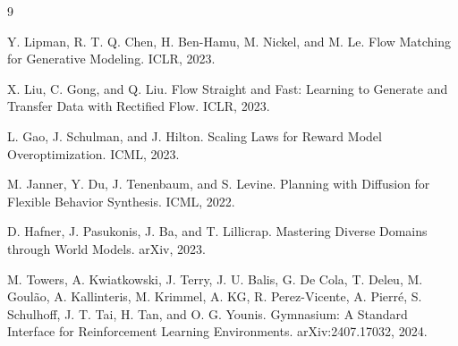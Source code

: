 \documentclass[10pt]{article}
\begin{document}
\begin{thebibliography}{9}

Y. Lipman, R. T. Q. Chen, H. Ben-Hamu, M. Nickel, and M. Le.
Flow Matching for Generative Modeling.
ICLR, 2023.

X. Liu, C. Gong, and Q. Liu.
Flow Straight and Fast: Learning to Generate and Transfer Data with Rectified Flow.
ICLR, 2023.

L. Gao, J. Schulman, and J. Hilton.
Scaling Laws for Reward Model Overoptimization.
ICML, 2023.

M. Janner, Y. Du, J. Tenenbaum, and S. Levine.
Planning with Diffusion for Flexible Behavior Synthesis.
ICML, 2022.

D. Hafner, J. Pasukonis, J. Ba, and T. Lillicrap.
Mastering Diverse Domains through World Models.
arXiv, 2023.

M. Towers, A. Kwiatkowski, J. Terry, J. U. Balis, G. De Cola, T. Deleu, M. Goul{\~a}o, A. Kallinteris, M. Krimmel, A. KG, R. Perez-Vicente, A. Pierr{\'e}, S. Schulhoff, J. T. Tai, H. Tan, and O. G. Younis.
Gymnasium: A Standard Interface for Reinforcement Learning Environments.
arXiv:2407.17032, 2024.

\end{thebibliography}
\end{document}
